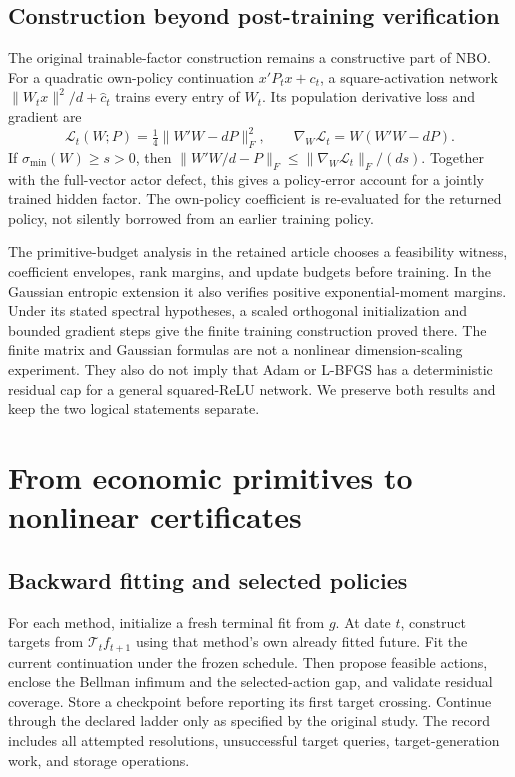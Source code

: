 \documentclass[ecta,nameyear,draft]{econsocart}
\begin{document}
\subsection{Construction beyond post-training verification}
The original trainable-factor construction remains a constructive part of NBO. For a quadratic own-policy continuation $x'P_tx+c_t$, a square-activation network $\|W_tx\|^2/d+\widehat c_t$ trains every entry of $W_t$. Its population derivative loss and gradient are
\[
 \mathcal L_t(W;P)=\tfrac14\|W'W-dP\|_F^2,
 \qquad \nabla_W\mathcal L_t=W(W'W-dP).
\]
If $\sigma_{\min}(W)\geq s>0$, then
$\|W'W/d-P\|_F\leq\|\nabla_W\mathcal L_t\|_F/(ds)$.
Together with the full-vector actor defect, this gives a policy-error account for a jointly trained hidden factor. The own-policy coefficient is re-evaluated for the returned policy, not silently borrowed from an earlier training policy.

The primitive-budget analysis in the retained article chooses a feasibility witness, coefficient envelopes, rank margins, and update budgets before training. In the Gaussian entropic extension it also verifies positive exponential-moment margins. Under its stated spectral hypotheses, a scaled orthogonal initialization and bounded gradient steps give the finite training construction proved there. The finite matrix and Gaussian formulas are not a nonlinear dimension-scaling experiment. They also do not imply that Adam or L-BFGS has a deterministic residual cap for a general squared-ReLU network. We preserve both results and keep the two logical statements separate.

\section{From economic primitives to nonlinear certificates}\label{sec:algorithm}
\subsection{Backward fitting and selected policies}
For each method, initialize a fresh terminal fit from $g$. At date $t$, construct targets from $\mathcal T_tf_{t+1}$ using that method's own already fitted future. Fit the current continuation under the frozen schedule. Then propose feasible actions, enclose the Bellman infimum and the selected-action gap, and validate residual coverage. Store a checkpoint before reporting its first target crossing. Continue through the declared ladder only as specified by the original study. The record includes all attempted resolutions, unsuccessful target queries, target-generation work, and storage operations.
\end{document}

